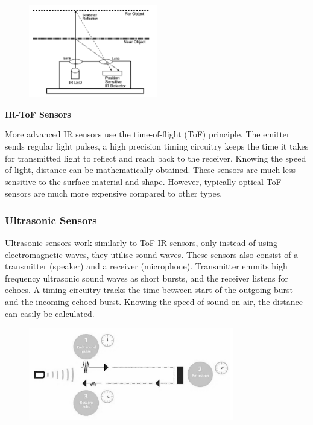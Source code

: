 \documentclass[12pt, a4paper]{article}
\begin{document}
                    \begin{figure}[H]\centering
                        \includegraphics[width=0.5\textwidth]{triangulation}
                    \end{figure}
                
                \bigskip\noindent
                \textbf{IR-ToF Sensors}

                    More advanced IR sensors use the time-of-flight (ToF) principle. The emitter sends regular light pulses, a high precision timing circuitry keeps the time it takes for transmitted light to reflect and reach back to the receiver. Knowing the speed of light, distance can be mathematically obtained. These sensors are much less sensitive to the surface material and shape. However, typically optical ToF sensors are much more expensive compared to other types.

                    
            
            \subsubsection{Ultrasonic Sensors}
                Ultrasonic sensors work similarly to ToF IR sensors, only instead of using electromagnetic waves, they utilise sound waves. These sensors also consist of a transmitter (speaker) and a receiver (microphone). Transmitter emmits high frequency ultrasonic sound waves as short bursts, and the receiver listens for echoes. A timing circuitry tracks the time between start of the outgoing burst and the incoming echoed burst. Knowing the speed of sound on air, the distance can easily be calculated.

                \begin{figure}[H]\centering
                    \includegraphics[width=0.8\textwidth]{ultrasonic.png}
                \end{figure}
\end{document}
